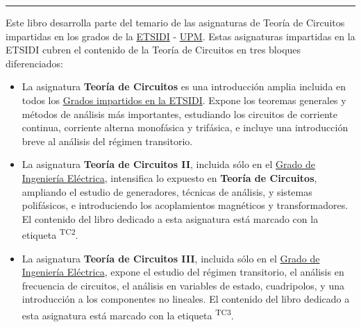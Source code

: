 \chapterprecis{\vfill{}
}
\rule[.5ex]{\linewidth}{1pt} 

Este libro desarrolla parte del temario de las asignaturas de Teoría de Circuitos impartidas en los grados de la \href{http://www.etsidi.upm.es/}{ETSIDI} - \href{http://www.upm.es/}{UPM}. Estas asignaturas impartidas en la ETSIDI cubren el contenido de la Teoría de Circuitos en tres bloques diferenciados:
\begin{itemize}
\item La asignatura \textbf{Teoría de Circuitos} es una introducción amplia incluida en todos los \href{http://www.etsidi.upm.es/Estudiantes/EstudiosTitulaciones/ETTitulosGrado/ETTitulosOficialesGrado}{Grados impartidos en la ETSIDI}. Expone los teoremas generales y métodos de análisis más importantes, estudiando los circuitos de corriente continua, corriente alterna monofásica y trifásica, e incluye una introducción breve al análisis del régimen transitorio.
\item La asignatura \textbf{Teoría de Circuitos II}, incluida sólo en el \href{http://www.etsidi.upm.es/Estudiantes/EstudiosTitulaciones/ETTitulosGrado/ETTitulosOficialesGrado/GradIngElectrica}{Grado de Ingeniería Eléctrica}, intensifica lo expuesto en \textbf{Teoría de Circuitos}, ampliando el estudio de generadores, técnicas de análisis, y sistemas polifásicos, e introduciendo los acoplamientos magnéticos y transformadores. El contenido del libro dedicado a esta asignatura está marcado con la etiqueta \textsuperscript{TC2}.
\item La asignatura \textbf{Teoría de Circuitos III}, incluida sólo en el \href{http://www.etsidi.upm.es/Estudiantes/EstudiosTitulaciones/ETTitulosGrado/ETTitulosOficialesGrado/GradIngElectrica}{Grado de Ingeniería Eléctrica}, expone el estudio del régimen transitorio, el análisis en frecuencia de circuitos, el análisis en variables de estado, cuadripolos, y una introducción a los componentes no lineales. El contenido del libro dedicado a esta asignatura está marcado con la etiqueta \textsuperscript{TC3}.
\end{itemize}

